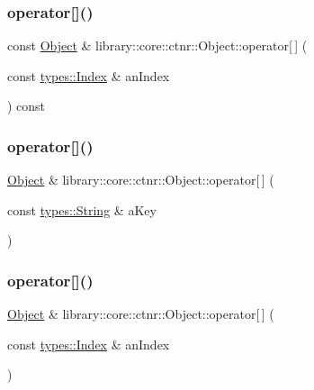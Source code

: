 \subsubsection{\texorpdfstring{operator[]()}{operator[]()}\hspace{0.1cm}{\footnotesize\ttfamily [2/4]}}
{\footnotesize\ttfamily const \mbox{\hyperlink{classlibrary_1_1core_1_1ctnr_1_1_object}{Object}} \& library\+::core\+::ctnr\+::\+Object\+::operator\mbox{[}$\,$\mbox{]} (\begin{DoxyParamCaption}\item[{const \mbox{\hyperlink{namespacelibrary_1_1core_1_1types_ad87eeb821d7067ec94e06ed1980d6350}{types\+::\+Index}} \&}]{an\+Index }\end{DoxyParamCaption}) const}

\mbox{\label{classlibrary_1_1core_1_1ctnr_1_1_object_ac6f1e43e985c9e31dbae1b1e87d72dca}} 
\subsubsection{\texorpdfstring{operator[]()}{operator[]()}\hspace{0.1cm}{\footnotesize\ttfamily [3/4]}}
{\footnotesize\ttfamily \mbox{\hyperlink{classlibrary_1_1core_1_1ctnr_1_1_object}{Object}} \& library\+::core\+::ctnr\+::\+Object\+::operator\mbox{[}$\,$\mbox{]} (\begin{DoxyParamCaption}\item[{const \mbox{\hyperlink{classlibrary_1_1core_1_1types_1_1_string}{types\+::\+String}} \&}]{a\+Key }\end{DoxyParamCaption})}

\mbox{\label{classlibrary_1_1core_1_1ctnr_1_1_object_ae403f6b0f9a93430c45908262ff95e5d}} 
\subsubsection{\texorpdfstring{operator[]()}{operator[]()}\hspace{0.1cm}{\footnotesize\ttfamily [4/4]}}
{\footnotesize\ttfamily \mbox{\hyperlink{classlibrary_1_1core_1_1ctnr_1_1_object}{Object}} \& library\+::core\+::ctnr\+::\+Object\+::operator\mbox{[}$\,$\mbox{]} (\begin{DoxyParamCaption}\item[{const \mbox{\hyperlink{namespacelibrary_1_1core_1_1types_ad87eeb821d7067ec94e06ed1980d6350}{types\+::\+Index}} \&}]{an\+Index }\end{DoxyParamCaption})}

